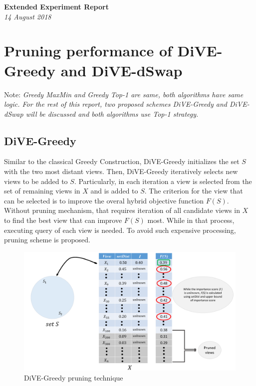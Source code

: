 \documentclass{article}
\begin{document}
\begin{titlepage}
	\begin{center}
		\Large\textbf{Extended Experiment Report}\\
		\large\textit{14 August 2018}
	\end{center}
\end{titlepage}

\section{Pruning performance of DiVE-Greedy and DiVE-dSwap}

Note: \textit{Greedy MaxMin and Greedy Top-1 are same, both algorithms have same logic. For the rest of this report, two proposed schemes DiVE-Greedy and DiVE-dSwap will be discussed and both algorithms use Top-1 strategy.} 

\subsection{DiVE-Greedy}
Similar to the classical Greedy Construction, DiVE-Greedy initializes the set $S$ with the two most distant views.
%
Then, DiVE-Greedy iteratively selects new views to be added to $S$. 
%
Particularly, in each iteration a view is selected from the set of remaining views in $X$ and is added to $S$.
%
The criterion for the view that can be selected is to improve the overal hybrid objective function $F(S)$. 
%
Without pruning mechanism, that requires iteration of all candidate views in $X$ to find the best view that can improve $F(S)$ most. While in that process, executing query of each view is needed. 
%
To avoid such expensive processing, pruning scheme is proposed. 
%

\begin{figure}
	\begin{center}
		\includegraphics[width=6.0in]{figures/DiVE-Greedy}
		\vspace{-9pt}
		\caption{DiVE-Greedy pruning technique}
		\label{fig:DiVE-Greedy}
		\vspace{-20pt}
	\end{center}
\end{figure}
\end{document}
